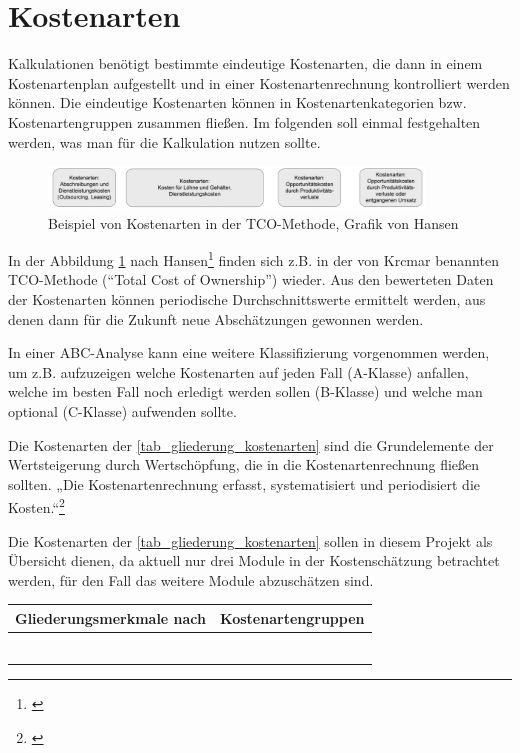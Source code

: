 \section{Kostenarten}
Kalkulationen benötigt bestimmte eindeutige Kostenarten, die dann in einem Kostenartenplan aufgestellt und in einer Kostenartenrechnung kontrolliert werden können. Die eindeutige Kostenarten können in Kostenartenkategorien bzw. Kostenartengruppen zusammen fließen.  Im folgenden soll einmal festgehalten werden, was man für die Kalkulation nutzen sollte.

\begin{figure}[h!]
	\centering
	\includegraphics[width=10cm]{kapitel/gruppe4_2/bilder/beispiel_kostenarten_TCO}
	\caption{Beispiel von Kostenarten in der TCO-Methode, Grafik von Hansen}
	\label{fig_kostenarten_TCO}
\end{figure}

In der Abbildung \ref{fig_kostenarten_TCO} nach Hansen\footnote{\cite{hansen_business_2009}} finden sich z.B. in der von Krcmar benannten TCO-Methode (“Total Cost of Ownership”) wieder. Aus den bewerteten Daten der Kostenarten können periodische Durchschnittswerte ermittelt werden, aus denen dann für die Zukunft neue Abschätzungen gewonnen werden.

In einer ABC-Analyse kann eine weitere Klassifizierung vorgenommen werden, um z.B. aufzuzeigen welche Kostenarten auf jeden Fall (A-Klasse) anfallen, welche im besten Fall noch erledigt werden sollen (B-Klasse) und welche man optional (C-Klasse) aufwenden sollte.

Die Kostenarten der \ref{tab_gliederung_kostenarten} sind die Grundelemente der Wertsteigerung durch Wertschöpfung, die in die Kostenartenrechnung fließen sollten. „Die Kostenartenrechnung erfasst, systematisiert und periodisiert die Kosten.“\footnote{\cite{reim_erfolgsrechnung_2015}} 

Die Kostenarten der \ref{tab_gliederung_kostenarten} sollen in diesem Projekt als Übersicht dienen, da aktuell nur drei Module in der Kostenschätzung betrachtet werden, für den Fall das weitere Module abzuschätzen sind.

\begin{center}
	\label{tab_gliederung_kostenarten}
\begin{tabular}{|l|l|}
	\hline Gliederungsmerkmale nach  &  Kostenartengruppen\\ 
	\hline  &  \\ 
	\hline  &  \\ 
	\hline  &  \\ 
	\hline  &  \\ 
	\hline  &  \\ 
	\hline  &  \\ 
	\hline 
\end{tabular}
\end{center}